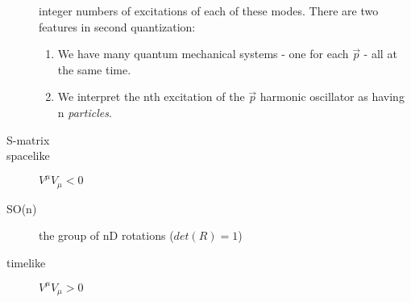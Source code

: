 \begin{description}
	integer numbers of excitations of each of these modes. There are two
	features in second quantization:
	\begin{enumerate}
	    \item We have many quantum mechanical systems - one for each
		$\vec{p}$ - all at the same time.
	    \item We interpret the nth excitation of the $\vec{p}$ harmonic
		oscillator as having n \emph{particles}.
	\end{enumerate}
    \item [S-matrix]
    \item [spacelike]	$V^\mu V_\mu < 0$
    \item [SO(n)] the group of nD rotations ($det(R) = 1$)
    \item [timelike]	$V^\mu V_\mu > 0$
\end{description}
